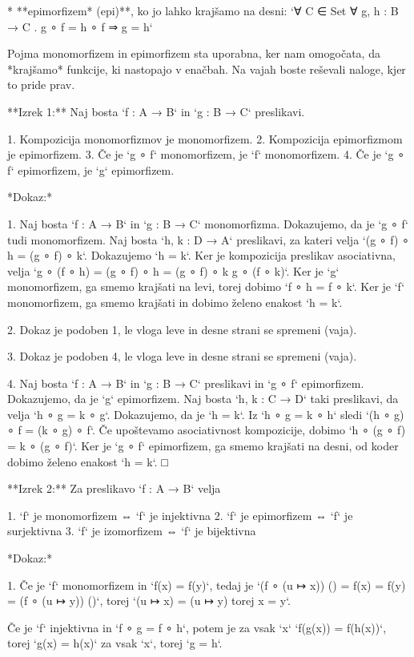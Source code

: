 * **epimorfizem* (epi)**, ko jo lahko krajšamo na desni:
  `∀ C ∈ Set ∀ g, h : B → C . g ∘ f = h ∘ f ⇒ g = h`

Pojma monomorfizem in epimorfizem sta uporabna, ker nam omogočata, da *krajšamo* funkcije, ki nastopajo v enačbah. Na
vajah boste reševali naloge, kjer to pride prav.

**Izrek 1:** Naj bosta `f : A → B` in `g : B → C` preslikavi.

1. Kompozicija monomorfizmov je monomorfizem.
2. Kompozicija epimorfizmom je epimorfizem.
3. Če je `g ∘ f` monomorfizem, je `f` monomorfizem.
4. Če je `g ∘ f` epimorfizem, je `g` epimorfizem.

*Dokaz:*

1. Naj bosta `f : A → B` in `g : B → C` monomorfizma. Dokazujemo, da je `g ∘ f` tudi monomorfizem.
   Naj bosta `h, k : D → A` preslikavi, za kateri velja `(g ∘ f) ∘ h  = (g ∘ f) ∘ k`. Dokazujemo `h = k`.
   Ker je kompozicija preslikav asociativna, velja `g ∘ (f ∘ h) = (g ∘ f) ∘ h  = (g ∘ f) ∘ k g ∘ (f ∘ k)`.
   Ker je `g` monomorfizem, ga smemo krajšati na levi, torej dobimo `f ∘ h = f ∘ k`. Ker je `f` monomorfizem,
   ga smemo krajšati in dobimo želeno enakost `h = k`.

2. Dokaz je podoben 1, le vloga leve in desne strani se spremeni (vaja).

3. Dokaz je podoben 4, le vloga leve in desne strani se spremeni (vaja).

4. Naj bosta `f : A → B` in `g : B → C` preslikavi in `g ∘ f` epimorfizem. Dokazujemo, da
   je `g` epimorfizem. Naj bosta `h, k : C → D` taki preslikavi, da velja `h ∘ g = k ∘ g`.
   Dokazujemo, da je `h = k`. Iz `h ∘ g = k ∘ h` sledi `(h ∘ g) ∘ f = (k ∘ g) ∘ f`. Če
   upoštevamo asociativnost kompozicije, dobimo `h ∘ (g ∘ f) = k ∘ (g ∘ f)`. Ker je `g ∘
   f` epimorfizem, ga smemo krajšati na desni, od koder dobimo želeno enakost `h = k`.
□

**Izrek 2:** Za preslikavo `f : A → B` velja

1. `f` je monomorfizem ⇔ `f` je injektivna
2. `f` je epimorfizem ⇔ `f` je surjektivna
3. `f` je izomorfizem ⇔ `f` je bijektivna

*Dokaz:*

1. Če je `f` monomorfizem in `f(x) = f(y)`, tedaj je
   `(f ∘ (u ↦ x)) () = f(x) = f(y) = (f ∘ (u ↦ y)) ()`, torej
   `(u ↦ x) = (u ↦ y) torej x = y`.

   Če je `f` injektivna in `f ∘ g = f ∘ h`, potem je za vsak `x`
   `f(g(x)) = f(h(x))`, torej `g(x) = h(x)` za vsak `x`, torej `g = h`.

